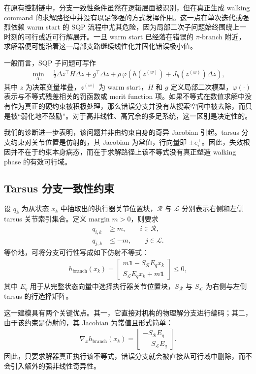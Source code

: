 在原有控制链中，分支一致性条件虽然在逻辑层面被识别，但在真正生成 walking command 的求解路径中并没有以足够强的方式发挥作用。这一点在单次迭代或强烈依赖 warm start 的 SQP 流程中尤其危险，因为局部二次子问题始终围绕上一时刻的可行或近可行解展开。一旦 warm start 已经落在错误的 $\pi$-branch 附近，求解器便可能沿着这一局部支路继续线性化并固化错误极小值。

一般而言，SQP 子问题可写作
\begin{align}
\min_{\Delta z} \quad \frac{1}{2}\Delta z^\top H \Delta z + g^\top \Delta z + \rho\,\varphi\!\left(h(z^{(w)}) + J_h(z^{(w)})\Delta z\right),
\end{align}
其中 $z$ 为决策变量堆叠，$z^{(w)}$ 为 warm start，$H$ 和 $g$ 定义局部二次模型，$\varphi(\cdot)$ 表示与不等式残差相关的罚函数或 merit function 项。如果不等式在数值求解中没有作为真正的硬约束被积极处理，那么错误分支并没有从搜索空间中被去除，而只是被“弱化地不鼓励”。对于高非线性、高冗余的多足系统，这一区别是决定性的。

我们的诊断进一步表明，该问题并非由约束自身的奇异 Jacobian 引起。tarsus 分支约束对关节位置是仿射的，其 Jacobian 为常值，行向量即 $\pm e_i^\top$。因此，失效根因并不在于约束本身病态，而在于求解路径上该不等式没有真正塑造 walking phase 的有效可行域。

\subsection{Tarsus 分支一致性约束}

设 $q_k$ 为从状态 $x_k$ 中抽取出的执行器关节位置块，$\mathcal{R}$ 与 $\mathcal{L}$ 分别表示右侧和左侧 tarsus 关节索引集合。定义 margin $m>0$，则要求
\begin{align}
q_{i,k} &\ge m, \qquad i \in \mathcal{R}, \\
q_{j,k} &\le -m, \qquad j \in \mathcal{L}.
\end{align}
等价地，可将分支可行性写成如下仿射不等式：
\begin{align}
h_{\mathrm{branch}}(x_k) =
\begin{bmatrix}
m\mathbf{1} - S_{\mathcal{R}} E_q x_k \\
S_{\mathcal{L}} E_q x_k + m\mathbf{1}
\end{bmatrix}
\le 0,
\end{align}
其中 $E_q$ 用于从完整状态向量中选择执行器关节位置块，$S_{\mathcal{R}}$ 与 $S_{\mathcal{L}}$ 为右侧与左侧 tarsus 的行选择矩阵。

这一建模具有两个关键优点。其一，它直接对机构的物理解分支进行编码；其二，由于该约束是仿射的，其 Jacobian 为常值且形式简单：
\begin{align}
\nabla_x h_{\mathrm{branch}}(x_k) =
\begin{bmatrix}
- S_{\mathcal{R}} E_q \\
\phantom{-} S_{\mathcal{L}} E_q
\end{bmatrix}.
\end{align}
因此，只要求解器真正执行该不等式，错误分支就会被直接从可行域中删除，而不会引入额外的强非线性奇异性。

